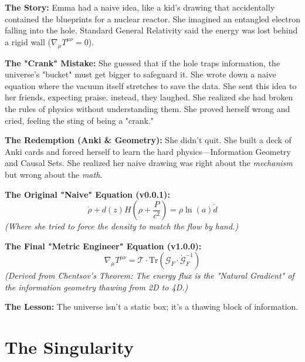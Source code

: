 \documentclass[11pt, a4paper, openany]{book}
\begin{document}
\begin{thoughtexp}
\textbf{The Story:}
Emma had a naive idea, like a kid's drawing that accidentally contained the blueprints for a nuclear reactor. She imagined an entangled electron falling into the hole. Standard General Relativity said the energy was lost behind a rigid wall ($\nabla_\mu T^{\mu\nu} = 0$).

\textbf{The "Crank" Mistake:}
She guessed that if the hole traps information, the universe's "bucket" must get bigger to safeguard it. She wrote down a naive equation where the vacuum itself stretches to save the data. She sent this idea to her friends, expecting praise. instead, they laughed. She realized she had broken the rules of physics without understanding them. She proved herself wrong and cried, feeling the sting of being a "crank."

\textbf{The Redemption (Anki \& Geometry):}
She didn't quit. She built a deck of Anki cards and forced herself to learn the hard physics—Information Geometry and Causal Sets. She realized her naive drawing was right about the \textit{mechanism} but wrong about the \textit{math}.

\textbf{The Original "Naive" Equation (v0.0.1):}
\[
\dot{\rho} + d(z)H \left( \rho + \frac{P}{c^2} \right) = \rho \ln(a)\dot{d}
\]
\textit{(Where she tried to force the density to match the flow by hand.)}

\textbf{The Final "Metric Engineer" Equation (v1.0.0):}
\[
\nabla_{\mu} T^{\mu\nu} = \mathcal{T} \cdot \text{Tr}(\mathcal{G}_{F} \cdot \dot{\mathcal{G}}_{F}^{-1})
\]
\textit{(Derived from Chentsov's Theorem: The energy flux is the "Natural Gradient" of the information geometry thawing from 2D to 4D.)}

\textbf{The Lesson:} The universe isn't a static box; it's a thawing block of information.
\end{thoughtexp}


\section{The Singularity}
\end{document}
